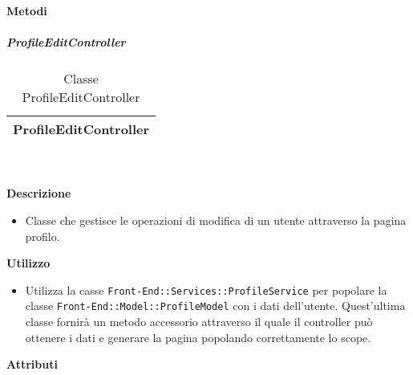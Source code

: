 		\textbf{Metodi} 
	\begin{itemize}
		\end{itemize}
			\subparagraph{ProfileEditController} 
\begin{table}[ht]
\begin{center}
\bgroup
	\setlength{\arrayrulewidth}{0.6mm}
	\def\arraystretch{1}
		\begin{tabular}{ | p{12cm} | }
				\hline  
					\centerline{\textbf{ProfileEditController}}
		\\ \hline 
				\hline
				\hline
		
		\end{tabular}
\egroup
\caption{Classe ProfileEditController}
\end{center}
\end{table}  \textbf{\\ \\ Descrizione} 
					\begin{itemize}
						\item[] Classe che gestisce le operazioni di modifica di un utente attraverso la pagina profilo.
					\end{itemize}      
				\textbf{Utilizzo}  
					\begin{itemize}
						\item[] Utilizza la casse \texttt{Front-End::Services::ProfileService} per popolare la classe \texttt{Front-End::Model::ProfileModel} con i dati dell'utente. Quest'ultima classe fornirà un metodo accessorio attraverso il quale il controller può ottenere i dati e generare la pagina popolando correttamente lo scope.
					\end{itemize}
			 \textbf{Attributi} 
	\begin{itemize}
		\end{itemize}
		

